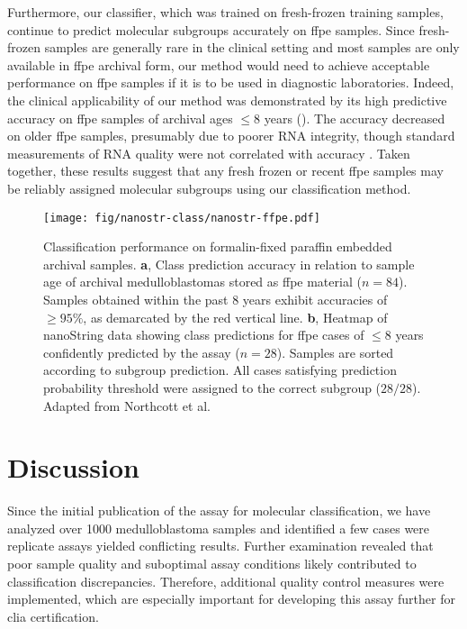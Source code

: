 Furthermore, our classifier, which was trained on fresh-frozen training samples, continue to predict molecular subgroups accurately on \gls{ffpe} samples. Since fresh-frozen samples are generally rare in the clinical setting and most samples are only available in \gls{ffpe} archival form, our method would need to achieve acceptable performance on \gls{ffpe} samples if it is to be used in diagnostic laboratories. Indeed, the clinical applicability of our method was demonstrated by its high predictive accuracy on \gls{ffpe} samples of archival ages $\leq 8$ years (). The accuracy decreased on older \gls{ffpe} samples, presumably due to poorer RNA integrity, though standard measurements of RNA quality were not correlated with accuracy . Taken together, these results suggest that any fresh frozen or recent \gls{ffpe} samples may be reliably assigned molecular subgroups using our classification method.

\begin{figure}[ht]
	\begin{center}
		\texttt{[image: fig/nanostr-class/nanostr-ffpe.pdf]}
	\end{center}
	\caption[Classification performance on formalin-fixed paraffin embedded archival samples]
	{
	Classification performance on formalin-fixed paraffin embedded archival samples.
	\textbf{a}, Class prediction accuracy in relation to sample age of archival medulloblastomas stored as \gls{ffpe} material ($n = 84$). Samples obtained within the past 8 years exhibit accuracies of $\geq 95\%$, as demarcated by the red vertical line.
	\textbf{b}, Heatmap of nanoString data showing class predictions for \gls{ffpe} cases of $\leq 8$ years confidently predicted by the assay ($n = 28$). Samples are sorted according to subgroup prediction. All cases satisfying prediction probability threshold were assigned to the correct subgroup ($28/28$). Adapted from Northcott et al.
	}
	\label{fig:nanostr-ffpe}
\end{figure}


\section{Discussion}

Since the initial publication of the assay for molecular classification, we have analyzed over 1000 medulloblastoma samples and identified a few cases were replicate assays yielded conflicting results. Further examination revealed that poor sample quality and suboptimal assay conditions likely contributed to classification discrepancies. Therefore, additional quality control measures were implemented, which are especially important for developing this assay further for \gls{clia} certification.

